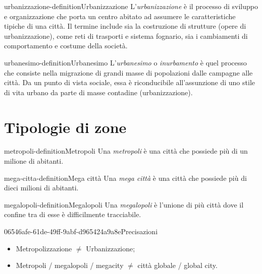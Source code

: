 \documentclass[preview]{standalone}
\begin{document}
\begin{snippetdefinition}{urbanizzazione-definition}{Urbanizzazione}
    L'\textit{urbanizzazione} è il processo di sviluppo e organizzazione
    che porta un centro abitato ad assumere le caratteristiche tipiche di una città.
    Il termine include sia la costruzione di strutture (opere di urbanizzazione),
    come reti di trasporti e sistema fognario, sia i cambiamenti di comportamento e
    costume della società. 
\end{snippetdefinition}

\begin{snippetdefinition}{urbanesimo-definition}{Urbanesimo}
    L'\textit{urbanesimo} o \textit{inurbamento} è quel processo che consiste nella migrazione
    di grandi masse di popolazioni dalle campagne alle città.
    Da un punto di vista sociale, essa è riconducibile all'assunzione di uno stile
    di vita urbano da parte di masse contadine (urbanizzazione). 
\end{snippetdefinition}


\section{Tipologie di zone}

\begin{snippetdefinition}{metropoli-definition}{Metropoli}
    Una \textit{metropoli} è una città che possiede più di un milione di abitanti.
\end{snippetdefinition}

\begin{snippetdefinition}{mega-citta-definition}{Mega città}
    Una \textit{mega città} è una città che possiede più di dieci milioni di abitanti.
\end{snippetdefinition}

\begin{snippetdefinition}{megalopoli-definition}{Megalopoli}
    Una \textit{megalopoli} è l'unione di più città dove il confine
    tra di esse è difficilmente tracciabile.
\end{snippetdefinition}


\begin{snippetnote}{06546afe-61de-49ff-9abf-d965424a9a8e}{Precisazioni}
    \begin{itemize}
        \item Metropolizzazione \(\neq\) Urbanizzazione;
        \item Metropoli / megalopoli / megacity \(\neq\) città globale / global
        city.
    \end{itemize}
\end{snippetnote}
\end{document}
